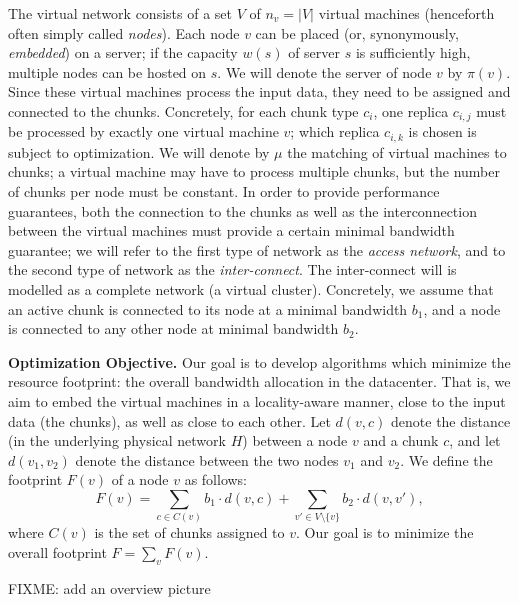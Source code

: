 \documentclass[9pt,twocolumn]{scrartcl}
\begin{document}
The virtual network consists of a set $V$ of $n_v=|V|$ virtual machines (henceforth often simply called \emph{nodes}).
Each node $v$ can be placed (or, synonymously, \emph{embedded}) on a server; if the capacity $w(s)$ of server $s$ is sufficiently high, multiple nodes can be hosted on $s$. We will denote the server of node $v$ by $\pi(v)$. 
Since these virtual machines process the input data, they need to be assigned and connected to the
chunks. Concretely, for each chunk type $c_i$, one replica $c_{i,j}$ must be processed by exactly one virtual machine $v$;
which replica $c_{i,k}$ is chosen is subject to optimization. 
We will denote by $\mu$ the matching of virtual machines to chunks; a virtual machine
may have to process multiple chunks, but the number of chunks per node must be constant.
In order to provide performance guarantees, both the connection to the chunks
as well as the interconnection between the virtual machines must provide a certain
minimal bandwidth guarantee; we will refer to the first type of network as the \emph{access
network}, and to the second type of network as the \emph{inter-connect}. The inter-connect will
is modelled as a complete network (a virtual cluster). Concretely, we assume that an  active chunk
is connected to its node at a minimal bandwidth $b_1$, and a node is connected to any other node
at minimal bandwidth $b_2$.

\textbf{Optimization Objective.} Our goal is to develop algorithms which minimize
the resource footprint: the overall bandwidth allocation in the datacenter. That is,
we aim to embed the virtual machines in a locality-aware manner, close to the input data
(the chunks), as well as close to
each other. Let $d(v,c)$ denote the distance (in the underlying physical network $H$) between a node $v$ and a
chunk $c$, and let $d(v_1,v_2)$ denote the distance between the two nodes $v_1$ and $v_2$.
We define the footprint $F(v)$ of a node $v$ as follows:
$$
F(v) = \sum_{c\in C(v)} b_1 \cdot d(v,c) + \sum_{v' \in V\setminus\{v\}} b_2 \cdot d(v,v'),
$$
where $C(v)$ is the set of chunks assigned to $v$. Our goal is to minimize the overall footprint
$F=\sum_v F(v)$.


FIXME: add an overview picture
\end{document}
